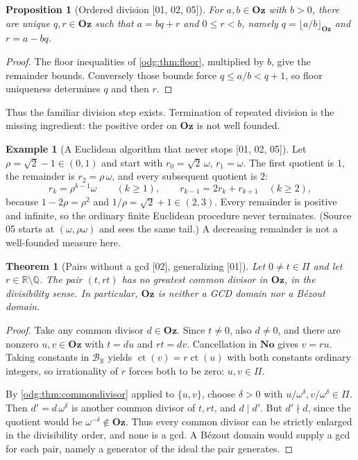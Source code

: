\documentclass[11pt,oneside]{article}
\numberwithin{equation}{section}
\newtheorem{theorem}{Theorem}[section]
\newtheorem{proposition}[proposition]{Proposition}
\theoremstyle{definition}
\newtheorem{example}[example]{Example}
\theoremstyle{remark}
\newcommand{\No}{\mathbf{No}}
\newcommand{\Oz}{\mathbf{Oz}}
\newcommand{\Q}{\mathbb Q}
\newcommand{\R}{\mathbb R}
\newcommand{\BR}{\mathcal B_{\R}}
\newcommand{\ct}{\operatorname{ct}}
\newcommand{\src}[1]{\textup{\textsf{\small[#1]}}}
\begin{document}
\begin{proposition}[Ordered division \src{01, 02, 05}]\label{odg:prop:division}
For $a,b\in\Oz$ with $b>0$, there are unique $q,r\in\Oz$ such that
$a=bq+r$ and $0\leq r<b$, namely $q=\lfloor a/b\rfloor_{\Oz}$ and
$r=a-bq$.
\end{proposition}
\begin{proof}
The floor inequalities of \cref{odg:thm:floor}, multiplied by $b$, give the
remainder bounds. Conversely those bounds force $q\leq a/b<q+1$, so floor
uniqueness determines $q$ and then $r$.
\end{proof}

Thus the familiar division step exists. Termination of repeated division
is the missing ingredient: the positive order on $\Oz$ is not well founded.

\begin{example}[A Euclidean algorithm that never stops \src{01, 02, 05}]\label{odg:ex:euclid}
Let $\rho=\sqrt2-1\in(0,1)$ and start with $r_0=\sqrt2\,\omega$,
$r_1=\omega$. The first quotient is $1$, the remainder is $r_2=\rho\,\omega$,
and every subsequent quotient is $2$:
\[
 r_k=\rho^{k-1}\omega\qquad(k\geq1),\qquad
 r_{k-1}=2r_k+r_{k+1}\quad(k\ge2),
\]
because $1-2\rho=\rho^2$ and $1/\rho=\sqrt2+1\in(2,3)$. Every remainder is
positive and infinite, so the ordinary finite Euclidean procedure never
terminates. (Source 05 starts at $(\omega,\rho\omega)$ and sees the same tail.)
A decreasing remainder is not a well-founded measure here.
\end{example}

\begin{theorem}[Pairs without a gcd \src{02}, generalizing \src{01}]\label{odg:thm:nogcd}
Let $0\ne t\in\Pi$ and let $r\in\R\setminus\Q$. The pair $(t,rt)$ has no
greatest common divisor in $\Oz$, in the divisibility sense. In particular,
$\Oz$ is neither a GCD domain nor a B\'ezout domain.
\end{theorem}
\begin{proof}
Take any common divisor $d\in\Oz$. Since $t\ne0$, also $d\ne0$, and there
are nonzero $u,v\in\Oz$ with $t=du$ and $rt=dv$. Cancellation in $\No$
gives $v=ru$. Taking constants in $\BR$ yields $\ct(v)=r\ct(u)$ with both
constants ordinary integers, so irrationality of $r$ forces both to be zero:
$u,v\in\Pi$.

By \cref{odg:thm:commondivisor} applied to $\{u,v\}$, choose $\delta>0$
with $u/\omega^\delta,v/\omega^\delta\in\Pi$. Then $d'=d\,\omega^\delta$ is
another common divisor of $t,rt$, and $d\mid d'$. But $d'\nmid d$, since the
quotient would be $\omega^{-\delta}\notin\Oz$. Thus every common divisor can
be strictly enlarged in the divisibility order, and none is a gcd. A
B\'ezout domain would supply a gcd for each pair, namely a generator of the
ideal the pair generates.
\end{proof}
\end{document}
